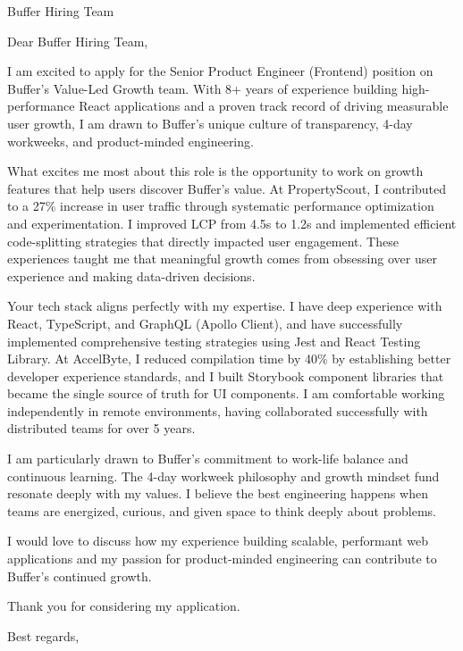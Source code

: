 \documentclass[11pt,a4paper]{letter}
\begin{document}
\begin{letter}{Buffer Hiring Team}

\opening{Dear Buffer Hiring Team,}

I am excited to apply for the Senior Product Engineer (Frontend) position on Buffer's Value-Led Growth team. With 8+ years of experience building high-performance React applications and a proven track record of driving measurable user growth, I am drawn to Buffer's unique culture of transparency, 4-day workweeks, and product-minded engineering.

What excites me most about this role is the opportunity to work on growth features that help users discover Buffer's value. At PropertyScout, I contributed to a 27\% increase in user traffic through systematic performance optimization and experimentation. I improved LCP from 4.5s to 1.2s and implemented efficient code-splitting strategies that directly impacted user engagement. These experiences taught me that meaningful growth comes from obsessing over user experience and making data-driven decisions.

Your tech stack aligns perfectly with my expertise. I have deep experience with React, TypeScript, and GraphQL (Apollo Client), and have successfully implemented comprehensive testing strategies using Jest and React Testing Library. At AccelByte, I reduced compilation time by 40\% by establishing better developer experience standards, and I built Storybook component libraries that became the single source of truth for UI components. I am comfortable working independently in remote environments, having collaborated successfully with distributed teams for over 5 years.

I am particularly drawn to Buffer's commitment to work-life balance and continuous learning. The 4-day workweek philosophy and growth mindset fund resonate deeply with my values. I believe the best engineering happens when teams are energized, curious, and given space to think deeply about problems.

I would love to discuss how my experience building scalable, performant web applications and my passion for product-minded engineering can contribute to Buffer's continued growth.

Thank you for considering my application.

\closing{Best regards,}

\end{letter}
\end{document}
